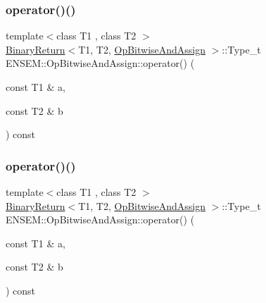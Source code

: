 \subsubsection{\texorpdfstring{operator()()}{operator()()}\hspace{0.1cm}{\footnotesize\ttfamily [1/3]}}
{\footnotesize\ttfamily template$<$class T1 , class T2 $>$ \\
\mbox{\hyperlink{structENSEM_1_1BinaryReturn}{Binary\+Return}}$<$T1, T2, \mbox{\hyperlink{structENSEM_1_1OpBitwiseAndAssign}{Op\+Bitwise\+And\+Assign}} $>$\+::Type\+\_\+t E\+N\+S\+E\+M\+::\+Op\+Bitwise\+And\+Assign\+::operator() (\begin{DoxyParamCaption}\item[{const T1 \&}]{a,  }\item[{const T2 \&}]{b }\end{DoxyParamCaption}) const\hspace{0.3cm}{\ttfamily [inline]}}

\mbox{\label{structENSEM_1_1OpBitwiseAndAssign_aeae291f2a2bdeac95b1d751d6d94b77d}} 
\subsubsection{\texorpdfstring{operator()()}{operator()()}\hspace{0.1cm}{\footnotesize\ttfamily [2/3]}}
{\footnotesize\ttfamily template$<$class T1 , class T2 $>$ \\
\mbox{\hyperlink{structENSEM_1_1BinaryReturn}{Binary\+Return}}$<$T1, T2, \mbox{\hyperlink{structENSEM_1_1OpBitwiseAndAssign}{Op\+Bitwise\+And\+Assign}} $>$\+::Type\+\_\+t E\+N\+S\+E\+M\+::\+Op\+Bitwise\+And\+Assign\+::operator() (\begin{DoxyParamCaption}\item[{const T1 \&}]{a,  }\item[{const T2 \&}]{b }\end{DoxyParamCaption}) const\hspace{0.3cm}{\ttfamily [inline]}}

\mbox{\label{structENSEM_1_1OpBitwiseAndAssign_aeae291f2a2bdeac95b1d751d6d94b77d}} 
